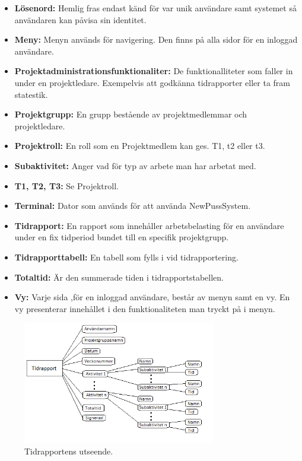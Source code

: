 \documentclass[a4paper]{article}
\begin{document}
\begin{itemize}
\item [] \textbf{Lösenord:} Hemlig fras endast känd för var unik användare samt systemet så användaren kan påvisa sin identitet.
\item [] \textbf{Meny:} Menyn används för navigering. Den finns på alla sidor för en inloggad användare.
\item [] \textbf{Projektadministrationsfunktionaliter:} De funktionalliteter som faller in under en projektledare. Exempelvis att godkänna tidrapporter eller ta fram statestik.
\item [] \textbf{Projektgrupp:} En grupp bestående av projektmedlemmar och projektledare.
\item [] \textbf{Projektroll:} En roll som en Projektmedlem kan ges. T1, t2 eller t3.
\item [] \textbf{Subaktivitet:} Anger vad för typ av arbete man har arbetat med.
\item [] \textbf{T1, T2, T3:} Se Projektroll.
\item [] \textbf{Terminal:} Dator som används för att använda NewPussSystem.
\item [] \textbf{Tidrapport:} En rapport som innehåller arbetsbelasting för en användare under en fix tidperiod bundet till en specifik projektgrupp.
\item [] \textbf{Tidrapporttabell:} En tabell som fylls i vid tidrapportering. 
\item [] \textbf{Totaltid:} Är den summerade tiden i tidrapportstabellen. 
\item [] \textbf{Vy:} Varje sida ,för en inloggad användare, består av menyn samt en vy. En vy presenterar innehållet i den funktionaliteten man tryckt på i menyn.
\end{itemize}
			\begin{figure}[h!]
				\centering
				\includegraphics[width=0.75\textwidth]{Tidrapport_Modell}
				\caption{Tidrapportens utseende.}
				\label{image_gen_tidrapport}
			\end{figure}
\end{document}
